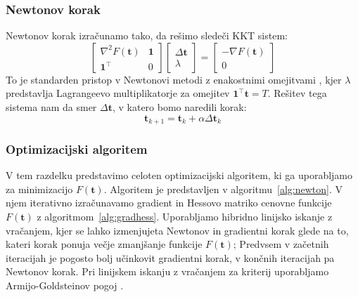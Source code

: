 \documentclass[mat2, tisk]{fmfdelo}
\newcommand{\tvec}{\mathbf{t}}
\begin{document}
\subsubsection{Newtonov korak}
Newtonov korak izračunamo tako, da rešimo sledeči \ac{KKT} sistem:
\begin{equation}
\label{eq:upper_system}
\begin{bmatrix}
    \nabla^2 F(\tvec) & \mathbf{1} \\
    \mathbf{1}^\top & 0
\end{bmatrix}
\begin{bmatrix}
    \Delta \tvec \\
    \lambda
\end{bmatrix}
=
\begin{bmatrix}
    -\nabla F(\tvec) \\
    0
\end{bmatrix}
\end{equation}
To je standarden pristop v Newtonovi metodi z enakostnimi omejitvami \cite{nocedal2006numerical}, kjer $\lambda$ predstavlja Lagrangeevo multiplikatorje za omejitev $\mathbf{1}^\top \mathbf{t} = T$. Rešitev tega sistema nam da smer $\Delta \tvec$, v katero bomo naredili korak:
\begin{equation}
    \tvec_{k+1} = \tvec_k + \alpha \Delta \tvec_k
\end{equation}

\subsubsection{Optimizacijski algoritem}

V tem razdelku predstavimo celoten optimizacijski algoritem, ki ga uporabljamo za minimizacijo $F(\tvec)$. Algoritem je predstavljen v algoritmu~\ref{alg:newton}. V njem iterativno izračunavamo gradient in Hessovo matriko cenovne funkcije $F(\tvec)$ z algoritmom~\ref{alg:gradhess}. Uporabljamo hibridno linijsko iskanje z vračanjem, kjer se lahko izmenjujeta Newtonov in gradientni korak glede na to, kateri korak ponuja večje zmanjšanje funkcije $F(\tvec)$; Predvsem v začetnih iteracijah je pogosto bolj učinkovit gradientni korak, v končnih iteracijah pa Newtonov korak. Pri linijskem iskanju z vračanjem za kriterij uporabljamo Armijo-Goldsteinov pogoj \cite{nocedal2006numerical}.
\end{document}
